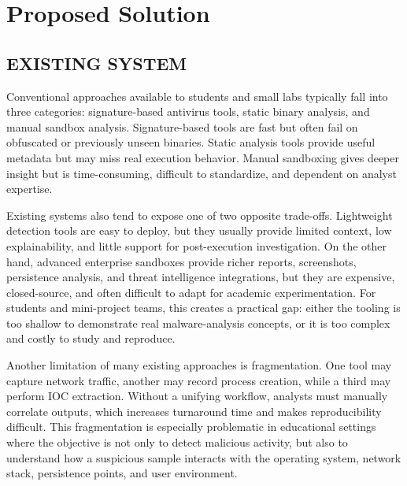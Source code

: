 \documentclass[a4paper,12pt,oneside]{report}
\begin{document}
\section{Proposed Solution}
\subsection{EXISTING SYSTEM}
Conventional approaches available to students and small labs typically fall into three categories: signature-based antivirus tools, static binary analysis, and manual sandbox analysis. Signature-based tools are fast but often fail on obfuscated or previously unseen binaries. Static analysis tools provide useful metadata but may miss real execution behavior. Manual sandboxing gives deeper insight but is time-consuming, difficult to standardize, and dependent on analyst expertise.

\par

\par

Existing systems also tend to expose one of two opposite trade-offs. Lightweight detection tools are easy to deploy, but they usually provide limited context, low explainability, and little support for post-execution investigation. On the other hand, advanced enterprise sandboxes provide richer reports, screenshots, persistence analysis, and threat intelligence integrations, but they are expensive, closed-source, and often difficult to adapt for academic experimentation. For students and mini-project teams, this creates a practical gap: either the tooling is too shallow to demonstrate real malware-analysis concepts, or it is too complex and costly to study and reproduce.

\par

\par

Another limitation of many existing approaches is fragmentation. One tool may capture network traffic, another may record process creation, while a third may perform IOC extraction. Without a unifying workflow, analysts must manually correlate outputs, which increases turnaround time and makes reproducibility difficult. This fragmentation is especially problematic in educational settings where the objective is not only to detect malicious activity, but also to understand how a suspicious sample interacts with the operating system, network stack, persistence points, and user environment.
\end{document}

